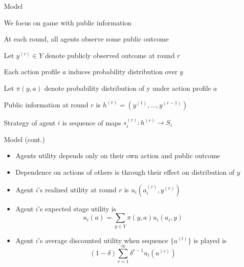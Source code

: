 \documentclass[11pt,aspectratio=169,handout]{beamer}
\begin{document}
  \begin{frame}{Model}
   \begin{itemizes}
    \item We focus on game with \alert{public information}
    \item At each round, \alert{all agents} observe some \alert{public outcome}
    \item Let $y^{(r)} \in Y$ denote publicly observed outcome at round $r$
    \item Each action profile $a$ induces \alert{probability distribution} over $y$
    \item Let $\pi (y, a)$ denote probability distribution of y under action profile $a$
    \item Public information at round $r$ is $h^{(r)}=(y^{(1)}, \dots, y^{(r-1)})$
    \item Strategy of agent $i$ is \alert{sequence of maps} $s_i^{(r)}: h^{(r)} \rightarrow S_i$ 
   \end{itemizes}
  \end{frame}
  
  \begin{frame}{Model (cont.)}
   \begin{itemize}[<+->]
    \item Agents utility depends \alert{only} on their own action and public outcome
    \item Dependence on actions of others is through their effect on distribution of $y$
    \item Agent $i$'s \alert{realized} utility at round $r$ is $u_i(a_i^{(r)}, y^{(r)})$
    \item Agent $i$'s expected stage utility is
    $$
    u_i(a) =\sum_{y\in Y}\pi(y,a)u_i(a_i,y) 
    $$
    \item Agent $i$'s average discounted utility when sequence $\{ a^{(t)}\}$ is played is
    $$
     (1 - \delta)\sum_{r=1}^{\infty}\delta^{r-1} u_i(a^{(r)}) 
    $$
   \end{itemize}
  \end{frame}
  
\end{document}
